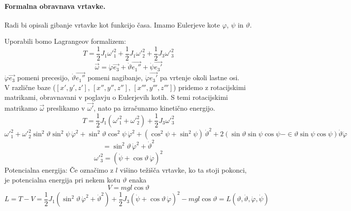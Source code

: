 \documentclass[a4paper]{article}
\newcommand{\vct}[1]{\overrightarrow{#1}}
\begin{document}
\paragraph{Formalna obravnava vrtavke.} Radi bi opisali gibanje vrtavke kot funkcijo časa. Imamo Eulerjeve kote $\varphi$, $\psi$ in $\vartheta$.
\begin{figure}[h!]
    \centering
\end{figure}
\newline
Uporabili bomo Lagrangeov formalizem:
$$T = \frac{1}{2}J_1{\omega'}_1^2 + \frac{1}{2}J_1{\omega'}_2^2 + \frac{1}{2}J_3{\omega'}_3^2$$
$$\vct{\omega} = \dot\varphi \vct{e_3} + \dot\vartheta \vct{e_1''} + \dot\psi\vct{e_3'}$$
$\dot\varphi \vct{e_3}$ pomeni precesijo, $\dot\vartheta \vct{e_1''}$ pomeni nagibanje, $\dot\varphi\vct{e_3'}$ pa vrtenje okoli lastne osi. \\
V različne baze ($[x', y', z']$, $[x'', y'', z'']$, $[x''', y''', z''']$) pridemo z rotacijskimi matrikami, obravnavani v poglavju o Eulerjevih kotih.
S temi rotacijskimi matrikamo $\vct{\omega}$ preslikamo v $\vct{\omega'}$, nato pa izračunamo kinetično energijo.
$$T = \frac{1}{2}J_1({\omega'}_1^2 + {\omega'}_2^2) + \frac{1}{2}J_3{\omega'}_3^2$$
$${\omega'}_1^2 + {\omega'}_2^2 \sin^2\vartheta\sin^2\psi\,\dot\varphi^2 + \sin^2\vartheta\cos^2\psi\,\dot\varphi^2 + (\cos^2\psi + \sin^2\psi)\,\dot\vartheta^2 + 2(\sin\vartheta\sin\psi\cos\psi - \in\vartheta\sin\psi\cos\psi)\dot\vartheta\dot\varphi$$
$$= \sin^2\vartheta\,\dot\varphi^2 + \dot\vartheta^2$$
$${\omega'}_3^2 = \left(\dot\psi + \cos\vartheta\,\dot\varphi\right)^2$$
Potencialna energija: Če označimo z $l$ višino težišča vrtavke, ko ta stoji pokonci, je potencialna energija pri nekem kotu $\vartheta$ enaka
$$V = mgl\cos\vartheta$$
$$L = T - V = \frac{1}{2} J_1\left(\sin^2\vartheta\,\dot\varphi^2+\dot\vartheta^2\right) + \frac{1}{2}J_3\left(\dot\psi + \cos\vartheta\,\dot\varphi\right)^2 - mgl\cos\vartheta = L(\vartheta, \dot\vartheta, \dot\varphi, \dot\psi)$$
\end{document}

